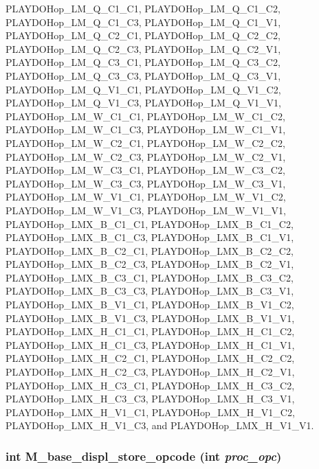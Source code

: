 PLAYDOHop\_\-LM\_\-Q\_\-C1\_\-C1, PLAYDOHop\_\-LM\_\-Q\_\-C1\_\-C2, PLAYDOHop\_\-LM\_\-Q\_\-C1\_\-C3, PLAYDOHop\_\-LM\_\-Q\_\-C1\_\-V1, PLAYDOHop\_\-LM\_\-Q\_\-C2\_\-C1, PLAYDOHop\_\-LM\_\-Q\_\-C2\_\-C2, PLAYDOHop\_\-LM\_\-Q\_\-C2\_\-C3, PLAYDOHop\_\-LM\_\-Q\_\-C2\_\-V1, PLAYDOHop\_\-LM\_\-Q\_\-C3\_\-C1, PLAYDOHop\_\-LM\_\-Q\_\-C3\_\-C2, PLAYDOHop\_\-LM\_\-Q\_\-C3\_\-C3, PLAYDOHop\_\-LM\_\-Q\_\-C3\_\-V1, PLAYDOHop\_\-LM\_\-Q\_\-V1\_\-C1, PLAYDOHop\_\-LM\_\-Q\_\-V1\_\-C2, PLAYDOHop\_\-LM\_\-Q\_\-V1\_\-C3, PLAYDOHop\_\-LM\_\-Q\_\-V1\_\-V1, PLAYDOHop\_\-LM\_\-W\_\-C1\_\-C1, PLAYDOHop\_\-LM\_\-W\_\-C1\_\-C2, PLAYDOHop\_\-LM\_\-W\_\-C1\_\-C3, PLAYDOHop\_\-LM\_\-W\_\-C1\_\-V1, PLAYDOHop\_\-LM\_\-W\_\-C2\_\-C1, PLAYDOHop\_\-LM\_\-W\_\-C2\_\-C2, PLAYDOHop\_\-LM\_\-W\_\-C2\_\-C3, PLAYDOHop\_\-LM\_\-W\_\-C2\_\-V1, PLAYDOHop\_\-LM\_\-W\_\-C3\_\-C1, PLAYDOHop\_\-LM\_\-W\_\-C3\_\-C2, PLAYDOHop\_\-LM\_\-W\_\-C3\_\-C3, PLAYDOHop\_\-LM\_\-W\_\-C3\_\-V1, PLAYDOHop\_\-LM\_\-W\_\-V1\_\-C1, PLAYDOHop\_\-LM\_\-W\_\-V1\_\-C2, PLAYDOHop\_\-LM\_\-W\_\-V1\_\-C3, PLAYDOHop\_\-LM\_\-W\_\-V1\_\-V1, PLAYDOHop\_\-LMX\_\-B\_\-C1\_\-C1, PLAYDOHop\_\-LMX\_\-B\_\-C1\_\-C2, PLAYDOHop\_\-LMX\_\-B\_\-C1\_\-C3, PLAYDOHop\_\-LMX\_\-B\_\-C1\_\-V1, PLAYDOHop\_\-LMX\_\-B\_\-C2\_\-C1, PLAYDOHop\_\-LMX\_\-B\_\-C2\_\-C2, PLAYDOHop\_\-LMX\_\-B\_\-C2\_\-C3, PLAYDOHop\_\-LMX\_\-B\_\-C2\_\-V1, PLAYDOHop\_\-LMX\_\-B\_\-C3\_\-C1, PLAYDOHop\_\-LMX\_\-B\_\-C3\_\-C2, PLAYDOHop\_\-LMX\_\-B\_\-C3\_\-C3, PLAYDOHop\_\-LMX\_\-B\_\-C3\_\-V1, PLAYDOHop\_\-LMX\_\-B\_\-V1\_\-C1, PLAYDOHop\_\-LMX\_\-B\_\-V1\_\-C2, PLAYDOHop\_\-LMX\_\-B\_\-V1\_\-C3, PLAYDOHop\_\-LMX\_\-B\_\-V1\_\-V1, PLAYDOHop\_\-LMX\_\-H\_\-C1\_\-C1, PLAYDOHop\_\-LMX\_\-H\_\-C1\_\-C2, PLAYDOHop\_\-LMX\_\-H\_\-C1\_\-C3, PLAYDOHop\_\-LMX\_\-H\_\-C1\_\-V1, PLAYDOHop\_\-LMX\_\-H\_\-C2\_\-C1, PLAYDOHop\_\-LMX\_\-H\_\-C2\_\-C2, PLAYDOHop\_\-LMX\_\-H\_\-C2\_\-C3, PLAYDOHop\_\-LMX\_\-H\_\-C2\_\-V1, PLAYDOHop\_\-LMX\_\-H\_\-C3\_\-C1, PLAYDOHop\_\-LMX\_\-H\_\-C3\_\-C2, PLAYDOHop\_\-LMX\_\-H\_\-C3\_\-C3, PLAYDOHop\_\-LMX\_\-H\_\-C3\_\-V1, PLAYDOHop\_\-LMX\_\-H\_\-V1\_\-C1, PLAYDOHop\_\-LMX\_\-H\_\-V1\_\-C2, PLAYDOHop\_\-LMX\_\-H\_\-V1\_\-C3, and PLAYDOHop\_\-LMX\_\-H\_\-V1\_\-V1.
\subsubsection{\setlength{\rightskip}{0pt plus 5cm}int M\_\-base\_\-displ\_\-store\_\-opcode (int {\em proc\_\-opc})}\label{ml__hpl__pd_8c_9f0df325e031621b23dc5100dcd703de}




